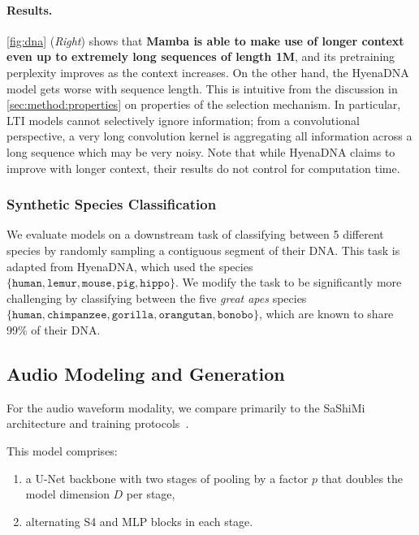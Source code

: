\paragraph{Results.}
\ref{fig:dna} (\emph{Right}) shows that \textbf{Mamba is able to make use of longer context even up to extremely long sequences of length 1M}, and its pretraining perplexity improves as the context increases. On the other hand, the HyenaDNA model gets worse with sequence length. This is intuitive from the discussion in \ref{sec:method:properties} on properties of the selection mechanism. In particular, LTI models cannot selectively ignore information; from a convolutional perspective, a very long convolution kernel is aggregating all information across a long sequence which may be very noisy. Note that while HyenaDNA claims to improve with longer context, their results do not control for computation time.

\subsubsection{Synthetic Species Classification}

We evaluate models on a downstream task of classifying between 5 different species by randomly sampling a contiguous segment of their DNA. This task is adapted from HyenaDNA, which used the species $\{ \texttt{human}, \texttt{lemur}, \texttt{mouse}, \texttt{pig}, \texttt{hippo} \}$.
We modify the task to be significantly more challenging by classifying between the five \emph{great apes} species \\ $\{ \texttt{human}, \texttt{chimpanzee}, \texttt{gorilla}, \texttt{orangutan}, \texttt{bonobo} \}$,
which are known to share 99\% of their DNA.

\subsection{Audio Modeling and Generation}
\label{sec:exp:audio}

For the audio waveform modality, we compare primarily to the SaShiMi architecture and training protocols~\citep{goel2022raw}.

  This model comprises:

\begin{enumerate}
  \item a U-Net backbone with two stages of pooling by a factor $p$ that doubles the model dimension $D$ per stage, \item alternating S4 and MLP blocks in each stage.
\end{enumerate}

